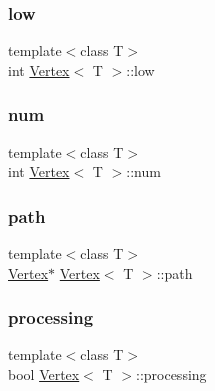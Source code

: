 \mbox{\label{class_vertex_a35d937c418952520cfa26b098e86b755}} 
\subsubsection{\texorpdfstring{low}{low}}
{\footnotesize\ttfamily template$<$class T$>$ \\
int \hyperlink{class_vertex}{Vertex}$<$ T $>$\+::low\hspace{0.3cm}{\ttfamily [private]}}

\mbox{\label{class_vertex_aeb941bcd51ef71c6101e02eaed1cae12}} 
\subsubsection{\texorpdfstring{num}{num}}
{\footnotesize\ttfamily template$<$class T$>$ \\
int \hyperlink{class_vertex}{Vertex}$<$ T $>$\+::num\hspace{0.3cm}{\ttfamily [private]}}

\mbox{\label{class_vertex_abd40febd917aa25add6bd42237c8463a}} 
\subsubsection{\texorpdfstring{path}{path}}
{\footnotesize\ttfamily template$<$class T$>$ \\
\hyperlink{class_vertex}{Vertex}$\ast$ \hyperlink{class_vertex}{Vertex}$<$ T $>$\+::path}

\mbox{\label{class_vertex_ae575d4b9a6b1ada3f9626c458c060f54}} 
\subsubsection{\texorpdfstring{processing}{processing}}
{\footnotesize\ttfamily template$<$class T$>$ \\
bool \hyperlink{class_vertex}{Vertex}$<$ T $>$\+::processing\hspace{0.3cm}{\ttfamily [private]}}

